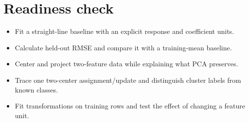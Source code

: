 \documentclass[11pt,letterpaper]{article}
\theoremstyle{definition}\newtheorem{definition}{Definition}\newtheorem{example}{Example}
\numberwithin{equation}{section}
\begin{document}
\section*{Readiness check}
\begin{itemize}
\item Fit a straight-line baseline with an explicit response and coefficient units.
\item Calculate held-out RMSE and compare it with a training-mean baseline.
\item Center and project two-feature data while explaining what PCA preserves.
\item Trace one two-center assignment/update and distinguish cluster labels from known classes.
\item Fit transformations on training rows and test the effect of changing a feature unit.
\end{itemize}
\end{document}
